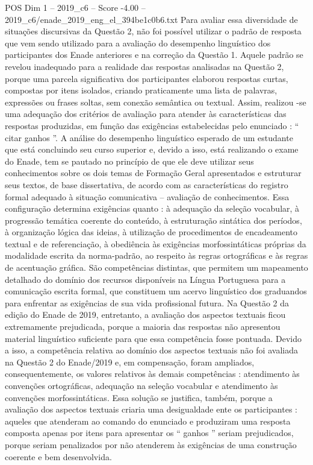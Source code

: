 \begin{textsample}{POS Dim 1 – 2019\_c6 – Score -4.00 – 2019\_c6/enade\_2019\_eng\_el\_394be1c0b6.txt}
Para avaliar essa diversidade de situações discursivas da Questão 2, não foi possível utilizar o padrão de resposta que vem sendo utilizado para a avaliação do desempenho linguístico dos participantes dos Enade anteriores e na correção da Questão 1.
Aquele padrão se revelou inadequado para a realidade das respostas analisadas na Questão 2, porque uma parcela significativa dos participantes elaborou respostas curtas, compostas por itens isolados, criando praticamente uma lista de palavras, expressões ou frases soltas, sem conexão semântica ou textual.
Assim, realizou -se uma adequação dos critérios de avaliação para atender às características das respostas produzidas, em função das exigências estabelecidas pelo enunciado : “ citar ganhos ”.
A análise do desempenho linguístico esperado de um estudante que está concluindo seu curso superior e, devido a isso, está realizando o exame do Enade, tem se pautado no princípio de que ele deve utilizar seus conhecimentos sobre os dois temas de Formação Geral apresentados e estruturar seus textos, de base dissertativa, de acordo com as características do registro formal adequado à situação comunicativa – avaliação de conhecimentos.
Essa configuração determina exigências quanto : à adequação da seleção vocabular, à progressão temática coerente do conteúdo, à estruturação sintática dos períodos, à organização lógica das ideias, à utilização de procedimentos de encadeamento textual e de referenciação, à obediência às exigências morfossintáticas próprias da modalidade escrita da norma-padrão, ao respeito às regras ortográficas e às regras de acentuação gráfica.
São competências distintas, que permitem um mapeamento detalhado do domínio dos recursos disponíveis na Língua Portuguesa para a comunicação escrita formal, que constituem um acervo linguístico dos graduandos para enfrentar as exigências de sua vida profissional futura.
Na Questão 2 da edição do Enade de 2019, entretanto, a avaliação dos aspectos textuais ficou extremamente prejudicada, porque a maioria das respostas não apresentou material linguístico suficiente para que essa competência fosse pontuada.
Devido a isso, a competência relativa ao domínio dos aspectos textuais não foi avaliada na Questão 2 do Enade/2019 e, em compensação, foram ampliados, consequentemente, os valores relativos às demais competências : atendimento às convenções ortográficas, adequação na seleção vocabular e atendimento às convenções morfossintáticas.
Essa solução se justifica, também, porque a avaliação dos aspectos textuais criaria uma desigualdade ente os participantes : aqueles que atenderam ao comando do enunciado e produziram uma resposta composta apenas por itens para apresentar os “ ganhos ” seriam prejudicados, porque seriam penalizados por não atenderem às exigências de uma construção coerente e bem desenvolvida.

\end{textsample}
